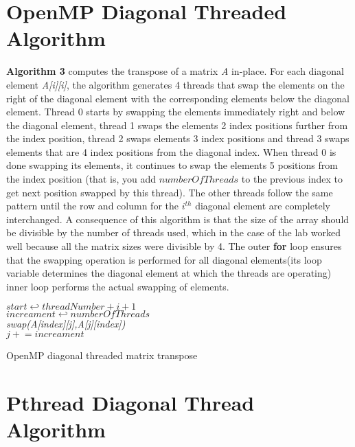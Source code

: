 \documentclass[11pt]{IEEEtran}
\begin{document}
\section{OpenMP Diagonal Threaded Algorithm}
\noindent
\textbf{Algorithm 3} computes the transpose of a matrix \emph{A} in-place. For each diagonal element \emph{A[i][i]}, the algorithm generates 4 threads that swap the elements on the right of the diagonal element with the corresponding elements below the diagonal element. Thread 0 starts by swapping the elements immediately right and below the diagonal element, thread 1 swaps the elements 2 index positions further from the index position, thread 2 swaps elements 3 index positions and thread 3 swaps elements that are 4 index positions from the diagonal index. When thread 0 is done swapping its elements, it continues to swap the elements 5 positions from the index position (that is, you add $numberOfThreads$ to the previous index to get next position swapped by this thread). The other threads follow the same pattern until the row and column for the $i^{th}$ diagonal element are completely interchanged. A consequence of this algorithm is that the size of the array should be divisible by the number of threads used, which in the case of the lab worked well because all the matrix sizes were divisible by 4. The outer \textbf{for} loop ensures that the swapping operation is performed for all diagonal elements(its loop variable determines the diagonal element at which the threads are operating) inner loop performs the actual swapping of elements. \\

\begin{algorithm}[H]
  
 {
   $start \hookleftarrow threadNumber + i + 1$ \\
   $increament \hookleftarrow numberOfThreads$\\
   
  {
    \emph{swap(A[index][j],A[j][index])} \\
    $j\mathrel{+}= increament$
  }
 }
 \caption{OpenMP diagonal threaded matrix transpose}
\end{algorithm}


\section{Pthread Diagonal Thread Algorithm}
\end{document}
